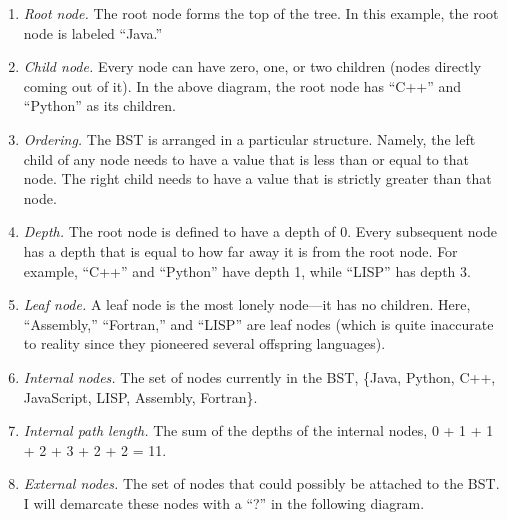 \documentclass[10pt]{article}
\begin{document}
\begin{enumerate}
\item \textit{Root node.}
The root node forms the top of the tree.
In this example, the root node is labeled ``Java.''

\item \textit{Child node.}
Every node can have zero, one, or two children (nodes directly coming out
of it).
In the above diagram, the root node has ``C++'' and ``Python'' as its children.

\item \textit{Ordering.}
The BST is arranged in a particular structure.
Namely, the left child of any node needs to have a value that is less than or equal
to that node.
The right child needs to have a value that is strictly greater than that node.

\item \textit{Depth.}
The root node is defined to have a depth of 0.
Every subsequent node has a depth that is equal to how far away it is
from the root node.
For example, ``C++'' and ``Python'' have depth 1, while ``LISP'' has depth 3.

\item \textit{Leaf node.}
A leaf node is the most lonely node---it has no children.
Here, ``Assembly,'' ``Fortran,'' and ``LISP'' are leaf nodes (which is quite
inaccurate to reality since they pioneered several offspring languages).

\item \textit{Internal nodes.}
The set of nodes currently in the BST, \{Java, Python, C++, JavaScript,
LISP, Assembly, Fortran\}.

\item \textit{Internal path length.}
The sum of the depths of the internal nodes, 0 + 1 + 1 + 2 + 3 + 2 + 2 = 11.

\item \textit{External nodes.}
The set of nodes that could possibly be attached to the BST.
I will demarcate these nodes with a ``?'' in the following diagram.
\begin{center}
\end{center}


\end{enumerate}
\end{document}
